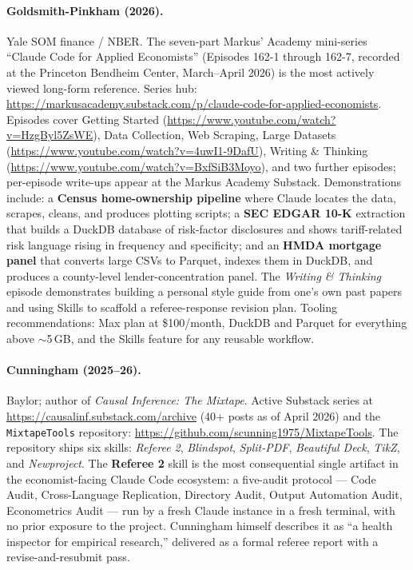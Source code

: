 \documentclass[11pt]{article}
\begin{document}
\paragraph{Goldsmith-Pinkham (2026).} Yale SOM finance / NBER. The seven-part Markus' Academy mini-series ``Claude Code for Applied Economists'' (Episodes 162-1 through 162-7, recorded at the Princeton Bendheim Center, March--April 2026) is the most actively viewed long-form reference. Series hub: \url{https://markusacademy.substack.com/p/claude-code-for-applied-economists}. Episodes cover Getting Started (\url{https://www.youtube.com/watch?v=HzgByl5ZsWE}), Data Collection, Web Scraping, Large Datasets (\url{https://www.youtube.com/watch?v=4uwI1-9DafU}), Writing \& Thinking (\url{https://www.youtube.com/watch?v=BxfSiB3Moyo}), and two further episodes; per-episode write-ups appear at the Markus Academy Substack. Demonstrations include: a \textbf{Census home-ownership pipeline} where Claude locates the data, scrapes, cleans, and produces plotting scripts; a \textbf{SEC EDGAR 10-K} extraction that builds a DuckDB database of risk-factor disclosures and shows tariff-related risk language rising in frequency and specificity; and an \textbf{HMDA mortgage panel} that converts large CSVs to Parquet, indexes them in DuckDB, and produces a county-level lender-concentration panel. The \emph{Writing \& Thinking} episode demonstrates building a personal style guide from one's own past papers and using Skills to scaffold a referee-response revision plan. Tooling recommendations: Max plan at \$100/month, DuckDB and Parquet for everything above $\sim$5\,GB, and the Skills feature for any reusable workflow.

\paragraph{Cunningham (2025--26).} Baylor; author of \emph{Causal Inference: The Mixtape}. Active Substack series at \url{https://causalinf.substack.com/archive} (40+ posts as of April 2026) and the \texttt{MixtapeTools} repository: \url{https://github.com/scunning1975/MixtapeTools}. The repository ships six skills: \emph{Referee 2}, \emph{Blindspot}, \emph{Split-PDF}, \emph{Beautiful Deck}, \emph{TikZ}, and \emph{Newproject}. The \textbf{Referee 2} skill is the most consequential single artifact in the economist-facing Claude Code ecosystem: a five-audit protocol --- Code Audit, Cross-Language Replication, Directory Audit, Output Automation Audit, Econometrics Audit --- run by a fresh Claude instance in a fresh terminal, with no prior exposure to the project. Cunningham himself describes it as ``a health inspector for empirical research,'' delivered as a formal referee report with a revise-and-resubmit pass.
\end{document}
